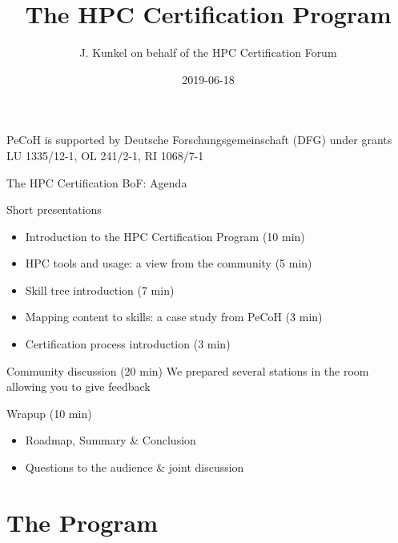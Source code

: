 \documentclass[compress,aspectratio=169]{beamer}
\subtitle{}
\title{\huge The HPC Certification Program}
\author{J. Kunkel on behalf of the HPC Certification Forum}
\date{2019-06-18}
\institute{Department of Computer Science}
\begin{document}
\begin{frame}[plain]{}
	\maketitle
	{\fontsize{5.85pt}{6pt}\selectfont PeCoH is supported by Deutsche Forschungsgemeinschaft (DFG) under grants LU 1335/12-1, OL 241/2-1, RI 1068/7-1}
\end{frame}


\begin{frame}{The HPC Certification BoF: Agenda}
	\begin{block}{Short presentations}
	\begin{itemize}
		\item Introduction to the HPC Certification Program (10 min)
		\item HPC tools and usage: a view from the community (5 min)
		\item Skill tree introduction (7 min)
		\item Mapping content to skills: a case study from PeCoH (3 min)
		\item Certification process introduction (3 min)
	\end{itemize}
	\end{block}

	\begin{block}{Community discussion (20 min)}
		We prepared several stations in the room allowing you to give feedback %
	\end{block}

	\begin{block}{Wrapup (10 min)}
	\vspace*{-0.5em}
		\begin{itemize}
			\item Roadmap, Summary \& Conclusion
			\item Questions to the audience \& joint discussion
		\end{itemize}
	\end{block}

\end{frame}


\section{The Program}
\sectionIntroHidden

\subsection{}
\end{document}

